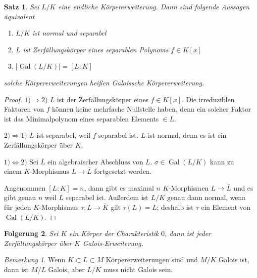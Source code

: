 \documentclass[a4paper,12pt,numbers=noenddot,parskip=full]{scrartcl}
\newcommand{\abs}[1]{{\left| #1 \right|}}
\newcommand{\heading}{\underline}
\DeclareMathOperator{\Gal}{Gal}
\theoremstyle{dotless}
\newtheorem{theorem}{Satz}[section]
\newtheorem{corollary}[theorem]{Folgerung}
\theoremstyle{remark}
\newtheorem*{remark}{Bemerkung}
\begin{document}
	\begin{theorem}
		Sei $L/K$ eine endliche Körpererweiterung. Dann sind folgende Aussagen äquivalent
		\begin{enumerate}
			\item $L/K$ ist normal und separabel
			\item $L$ ist Zerfällungskörper eines separablen Polynoms $f \in K[x]$
			\item $\abs{\Gal(L/K)} = [L:K]$
		\end{enumerate}
		solche Körpererweiterungen heißen Galoissche Körpererweiterung.
	\end{theorem}

	\begin{proof}
		\heading{$1) \Rightarrow 2)$} $L$ ist der Zerfällungskörper eines $f \in K[x]$. Die irreduziblen Faktoren von $f$ können keine mehrfache Nullstelle haben, denn ein solcher Faktor ist das Minimalpolynom eines separablen Elements $\in L$.
		
		\heading{$2) \Rightarrow 1)$} $L$ ist separabel, weil $f$ separabel ist. $L$ ist normal, denn es ist ein Zerfällungskörper über $K$.
		
		\heading{$1) \Leftrightarrow 2)$} Sei $\overline{L}$ ein algebraischer Abschluss von $L$. $\sigma \in \Gal(L/K)$ kann zu einem $K$-Morphismus $L \to \overline{L}$ fortgesetzt werden.
		
		Angenommen $[L:K] = n$, dann gibt es maximal $n$ $K$-Morphismen $L \to \overline{L}$ und es gibt genau $n$ weil $L$ separabel ist. Außerdem ist $L/K$ genau dann normal, wenn für jeden $K$-Morphismus $\tau: L \to \overline{K}$ gilt $\tau(L) = L$; deshalb ist $\tau$ ein Element von $\Gal(L/K)$.
	\end{proof}

	\begin{corollary}
		Sei $K$ ein Körper der Charakteristik $0$, dann ist jeder Zerfällungskörper über $K$ Galois-Erweiterung.
	\end{corollary}

	\begin{remark}
		Wenn $K \subset L \subset M$ Körpererweiterungen sind und $M/K$ Galois ist, dann ist $M/L$ Galois, aber $L/K$ muss nicht Galois sein.
	\end{remark}
\end{document}
